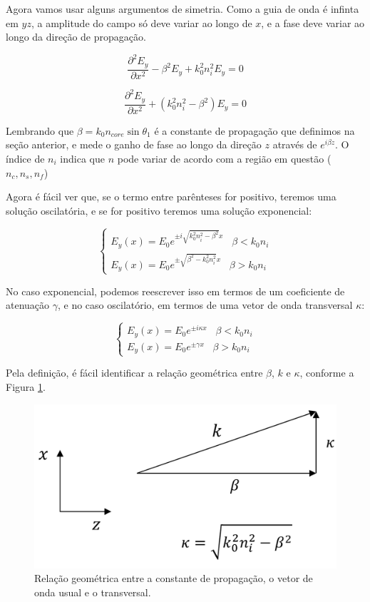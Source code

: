 \documentclass[12pt,a4paper]{report}
\begin{document}
Agora vamos usar alguns argumentos de simetria. Como a guia de onda é infinta em $yz$, a amplitude do campo só deve variar ao longo de $x$, e a fase deve variar ao longo da direção de propagação.

\begin{equation}
    \frac{\partial^2 E_y}{\partial x^2}-\beta^2E_y+k_0^2n_i^2 E_y=0
\end{equation}

\begin{equation}
    \boxed{\frac{\partial^2 E_y}{\partial x^2}+(k_0^2n_i^2-\beta^2)E_y=0}
\end{equation}

Lembrando que $\beta=k_0n_{core}\sin\theta_1$ é a constante de propagação que definimos na seção anterior, e mede o ganho de fase ao longo da direção $z$ através de $e^{i\beta z}$. O índice de $n_i$ indica que $n$ pode variar de acordo com a região em questão ($n_c, n_s, n_f$)

Agora é fácil ver que, se o termo entre parênteses for positivo, teremos uma solução oscilatória, e se for positivo teremos uma solução exponencial:

\begin{equation}
    \begin{cases}
        E_y(x)=E_0e^{\pm i\sqrt{k_0^2n_i^2-\beta^2}x}\;\;\; \beta<k_0n_i \\
        E_y(x)=E_0e^{\pm\sqrt{\beta^2-k_0^2n_i^2}x}\;\;\; \beta>k_0n_i
    \end{cases}
\end{equation}

No caso exponencial, podemos reescrever isso em termos de um coeficiente de atenuação $\gamma$, e no caso oscilatório, em termos de uma vetor de onda transversal $\kappa$:

\begin{equation}
    \begin{cases}
        E_y(x)=E_0e^{\pm i\kappa x}\;\;\; \beta<k_0n_i \\
        E_y(x)=E_0e^{\pm \gamma x}\;\;\; \beta>k_0n_i
    \end{cases}
\end{equation}

Pela definição, é fácil identificar a relação geométrica entre $\beta$, $k$ e $\kappa$, conforme a Figura \ref{transverse.wavevector}.

\begin{figure}[H]
    \centering
    \includegraphics[width=0.4\linewidth]{transverse wavevecotr.png}
    \caption{Relação geométrica entre a constante de propagação, o vetor de onda usual e o transversal.}
    \label{transverse.wavevector}
\end{figure}
\end{document}
